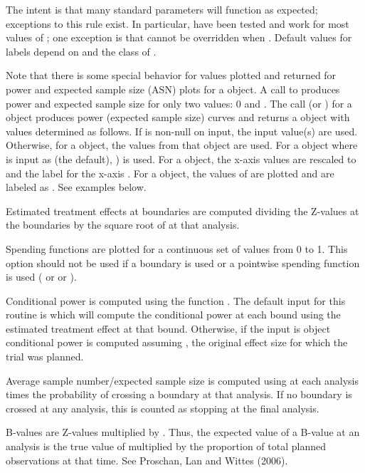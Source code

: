 \begin{Details}\relax
The intent is that many standard  parameters will function as expected; exceptions to this rule exist.
In particular,  have been tested and work for most values of ; one
exception is that  cannot be overridden when . Default values for labels depend on  and 
the class of .

Note that there is some special behavior for values plotted and returned 
for power and expected sample size (ASN) plots for a  object.
A call to  produces power and expected sample size for only two  values: 0 and . 
The call  (or ) for a  object produces power (expected sample size) curves and returns a  object with  values determined as follows. 
If  is non-null on input, the input value(s) are used.
Otherwise, for a  object, the  values from that object are used.
For a  object where  is input as  (the default), ) is used. 
For a  object, the x-axis values are rescaled to  and the label for the x-axis .
For a  object, the values of  are plotted and are labeled as .
See examples below.

Estimated treatment effects at boundaries are computed dividing the Z-values at the boundaries by the square root of  at that analysis. 

Spending functions are plotted for a continuous set of values from 0 to 1. 
This option should not be used if a boundary is used or a pointwise spending function is used
( or  or ). 

Conditional power is computed using the function . 
The default input for this routine is  which will compute the conditional power at each bound using the estimated treatment effect at that bound. 
Otherwise, if the input is  object conditional power is computed assuming , the original effect size for which the trial was planned.

Average sample number/expected sample size is computed using  at each analysis times the probability of crossing a boundary at that analysis.
If no boundary is crossed at any analysis, this is counted as stopping at the final analysis.

B-values are Z-values multiplied by . 
Thus, the expected value of a B-value at an analysis is the true value of 
 multiplied by the proportion of total planned observations at that time.
See Proschan, Lan and Wittes (2006).
\end{Details}
